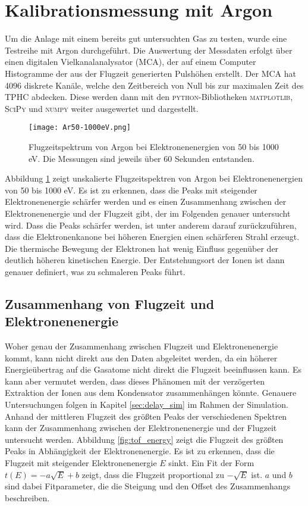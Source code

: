 \section{Kalibrationsmessung mit Argon}
Um die Anlage mit einem bereits gut untersuchten Gas zu testen, wurde eine Testreihe mit Argon durchgeführt. Die Auswertung der Messdaten erfolgt über einen digitalen Vielkanalanalysator (MCA), der auf einem Computer Histogramme der aus der Flugzeit generierten Pulshöhen erstellt. Der MCA hat 4096 diskrete Kanäle, welche den Zeitbereich von Null bis zur maximalen Zeit des TPHC abdecken. Diese werden dann mit den \textsc{python}-Bibliotheken \textsc{matplotlib}, \textsc{SciPy} und \textsc{numpy} weiter ausgewertet und dargestellt. 
\begin{figure}
    \hspace{-1.1cm}\texttt{[image: Ar50-1000eV.png]}
    \caption[Flugzeitspektrum von Argon bei Elektronenenergien von 50 bis 1000 eV]{Flugzeitspektrum von Argon bei Elektronenenergien von 50 bis 1000 eV. Die Messungen sind jeweils über 60 Sekunden entstanden.}
    \label{fig:ar}
\end{figure}
Abbildung \ref{fig:ar} zeigt unskalierte Flugzeitspektren von Argon bei Elektronenenergien von 50 bis 1000 eV. Es ist zu erkennen, dass die Peaks mit steigender Elektronenenergie schärfer werden und es einen Zusammenhang zwischen der Elektronenenergie und der Flugzeit gibt, der im Folgenden genauer untersucht wird. Dass die Peaks schärfer werden, ist unter anderem darauf zurückzuführen, dass die Elektronenkanone bei höheren Energien einen schärferen Strahl erzeugt. Die thermische Bewegung der Elektronen hat wenig Einfluss gegenüber der deutlich höheren kinetischen Energie. Der Entstehungsort der Ionen ist dann genauer definiert, was zu schmaleren Peaks führt.

\subsection{Zusammenhang von Flugzeit und Elektronenenergie}
Woher genau der Zusammenhang zwischen Flugzeit und Elektronenenergie kommt, kann nicht direkt aus den Daten abgeleitet werden, da ein höherer Energieübertrag auf die Gasatome nicht direkt die Flugzeit beeinflussen kann. Es kann aber vermutet werden, dass dieses Phänomen mit der verzögerten Extraktion der Ionen aus dem Kondensator zusammenhängen könnte. Genauere Untersuchungen folgen in Kapitel \ref{sec:delay_sim} im Rahmen der Simulation. Anhand der mittleren Flugzeit des größten Peaks der verschiedenen Spektren kann der Zusammenhang zwischen der Elektronenenergie und der Flugzeit untersucht werden.
Abbildung \ref{fig:tof_energy} zeigt die Flugzeit des größten Peaks in Abhängigkeit der Elektronenenergie. Es ist zu erkennen, dass die Flugzeit mit steigender Elektronenenergie $E$ sinkt. Ein Fit der Form $t(E) = -a\sqrt{E} + b$ zeigt, dass die Flugzeit proportional zu $-\sqrt{E}$ ist. $a$ und $b$ sind dabei Fitparameter, die die Steigung und den Offset des Zusammenhangs beschreiben. 

